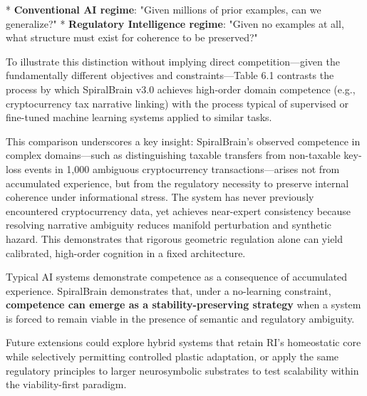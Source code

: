 \documentclass[12pt,a4paper]{report}
\begin{document}
* \textbf{Conventional AI regime}: "Given millions of prior examples, can we generalize?"
* \textbf{Regulatory Intelligence regime}: "Given no examples at all, what structure must exist for coherence to be preserved?"

To illustrate this distinction without implying direct competition—given the fundamentally different objectives and constraints—Table 6.1 contrasts the process by which SpiralBrain v3.0 achieves high-order domain competence (e.g., cryptocurrency tax narrative linking) with the process typical of supervised or fine-tuned machine learning systems applied to similar tasks.

This comparison underscores a key insight: SpiralBrain's observed competence in complex domains—such as distinguishing taxable transfers from non-taxable key-loss events in 1,000 ambiguous cryptocurrency transactions—arises not from accumulated experience, but from the regulatory necessity to preserve internal coherence under informational stress. The system has never previously encountered cryptocurrency data, yet achieves near-expert consistency because resolving narrative ambiguity reduces manifold perturbation and synthetic hazard. This demonstrates that rigorous geometric regulation alone can yield calibrated, high-order cognition in a fixed architecture.

Typical AI systems demonstrate competence as a consequence of accumulated experience. SpiralBrain demonstrates that, under a no-learning constraint, \textbf{competence can emerge as a stability-preserving strategy} when a system is forced to remain viable in the presence of semantic and regulatory ambiguity.

Future extensions could explore hybrid systems that retain RI's homeostatic core while selectively permitting controlled plastic adaptation, or apply the same regulatory principles to larger neurosymbolic substrates to test scalability within the viability-first paradigm.

\begingroup
\setlength{\tabcolsep}{6pt}
\renewcommand{\arraystretch}{1.2}
\end{document}

